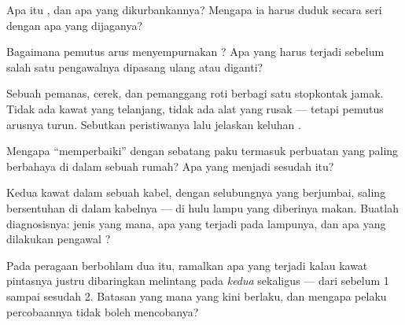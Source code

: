 \begin{exercise}[$\star$]\label{exo:g7:short-circuits-safety:5}
Apa itu , dan apa yang dikurbankannya? Mengapa ia harus duduk
secara seri dengan apa yang dijaganya?
\end{exercise}

\begin{exercise}[$\star$]\label{exo:g7:short-circuits-safety:6}
Bagaimana pemutus arus menyempurnakan ? Apa yang harus
terjadi sebelum salah satu pengawalnya dipasang ulang atau diganti?
\end{exercise}

\begin{exercise}[$\star$]\label{exo:g7:short-circuits-safety:7}
Sebuah pemanas, cerek, dan pemanggang roti berbagi satu stopkontak
jamak. Tidak ada kawat yang telanjang, tidak ada alat yang rusak ---
tetapi pemutus arusnya turun. Sebutkan peristiwanya lalu jelaskan
keluhan .
\end{exercise}

\begin{exercise}[$\star$]\label{exo:g7:short-circuits-safety:8}
Mengapa ``memperbaiki''  dengan sebatang paku termasuk perbuatan
yang paling berbahaya di dalam sebuah rumah? Apa yang menjadi
 sesudah itu?
\end{exercise}

\begin{exercise}[$\star\star$]\label{exo:g7:short-circuits-safety:9}
Kedua kawat dalam sebuah kabel, dengan selubungnya yang berjumbai,
saling bersentuhan di dalam kabelnya --- di hulu lampu yang diberinya
makan. Buatlah diagnosisnya:  jenis yang mana, apa yang
terjadi pada lampunya, dan apa yang dilakukan pengawal ?
\end{exercise}

\begin{exercise}[$\star\star$]\label{exo:g7:short-circuits-safety:10}
Pada peragaan berbohlam dua itu, ramalkan apa yang terjadi kalau kawat
pintasnya justru dibaringkan melintang pada \emph{kedua} 
sekaligus --- dari sebelum  1 sampai sesudah  2. Batasan
yang mana yang kini berlaku, dan mengapa pelaku percobaannya tidak
boleh mencobanya?
\end{exercise}

